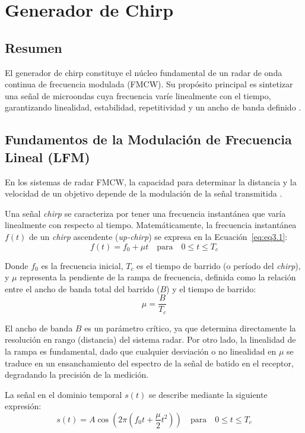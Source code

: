 \chapter{Generador de Chirp}
\section*{Resumen}
El generador de chirp constituye el núcleo fundamental de un radar de onda continua de frecuencia modulada (FMCW). Su propósito principal es sintetizar una señal de microondas cuya frecuencia varíe linealmente con el tiempo, garantizando linealidad, estabilidad, repetitividad y un ancho de banda definido \cite{Andy Harrison}.

\section{Fundamentos de la Modulación de Frecuencia Lineal (LFM)}
En los sistemas de radar FMCW, la capacidad para determinar la distancia y la velocidad de un objetivo depende de la modulación de la señal transmitida \cite{Andy Harrison}. 

Una señal \textit{chirp} se caracteriza por tener una frecuencia instantánea que varía linealmente con respecto al tiempo. Matemáticamente, la frecuencia instantánea $f(t)$ de un \textit{chirp} ascendente (\textit{up-chirp}) se expresa en la Ecuación~\ref{eq:eq3.1}:
\begin{equation}
    f(t) = f_0 + \mu t \quad \text{para} \quad 0 \leq t \leq T_c
    \label{eq:eq3.1}
\end{equation}

Donde $f_0$ es la frecuencia inicial, $T_c$ es el tiempo de barrido (o período del \textit{chirp}), y $\mu$ representa la pendiente de la rampa de frecuencia, definida como la relación entre el ancho de banda total del barrido ($B$) y el tiempo de barrido:
\begin{equation}
    \mu = \frac{B}{T_c}
    \label{eq:pendiente_chirp}
\end{equation}

El ancho de banda $B$ es un parámetro crítico, ya que determina directamente la resolución en rango (distancia) del sistema radar. Por otro lado, la linealidad de la rampa es fundamental, dado que cualquier desviación o no linealidad en $\mu$ se traduce en un ensanchamiento del espectro de la señal de batido en el receptor, degradando la precisión de la medición.

La señal en el dominio temporal $s(t)$ se describe mediante la siguiente expresión:
\begin{equation}
    s(t) = A \cos\!\left(2\pi\left(f_0 t + \frac{\mu}{2} t^2\right)\right) \quad \text{para} \quad 0 \leq t \leq T_c
    \label{eq:senal_chirp_tiempo}
\end{equation}

